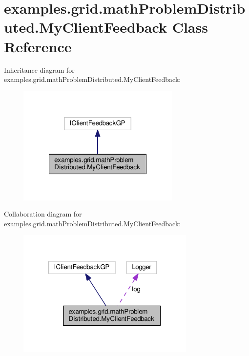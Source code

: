 \hypertarget{classexamples_1_1grid_1_1math_problem_distributed_1_1_my_client_feedback}{\section{examples.\-grid.\-math\-Problem\-Distributed.\-My\-Client\-Feedback Class Reference}
\label{classexamples_1_1grid_1_1math_problem_distributed_1_1_my_client_feedback}
}


Inheritance diagram for examples.\-grid.\-math\-Problem\-Distributed.\-My\-Client\-Feedback\-:
\nopagebreak
\begin{figure}[H]
\begin{center}
\leavevmode
\includegraphics[width=228pt]{classexamples_1_1grid_1_1math_problem_distributed_1_1_my_client_feedback__inherit__graph}
\end{center}
\end{figure}


Collaboration diagram for examples.\-grid.\-math\-Problem\-Distributed.\-My\-Client\-Feedback\-:
\nopagebreak
\begin{figure}[H]
\begin{center}
\leavevmode
\includegraphics[width=250pt]{classexamples_1_1grid_1_1math_problem_distributed_1_1_my_client_feedback__coll__graph}
\end{center}
\end{figure}
